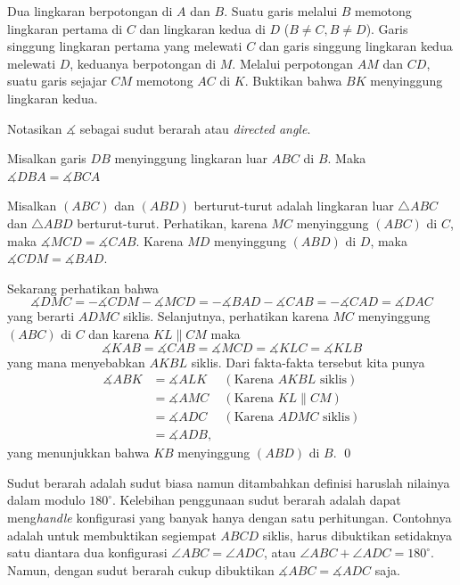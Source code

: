 \documentclass[12pt]{scrartcl}
\begin{document}
	\begin{soaljawab} Dua lingkaran berpotongan di $A$ dan $B$. Suatu garis melalui $B$ memotong lingkaran pertama di $C$ dan lingkaran kedua di $D$ ($B \neq C, B \neq D$).  Garis singgung lingkaran pertama yang melewati $C$ dan garis singgung lingkaran kedua melewati $D$, keduanya berpotongan di $M$. Melalui perpotongan $AM$ dan $CD$, suatu garis sejajar $CM$ memotong $AC$ di $K$. Buktikan bahwa $BK$ menyinggung lingkaran kedua.\\
	
	\begin{solusi}
		Notasikan $\measuredangle$ sebagai sudut berarah atau \textit{directed angle}.
		
		\begin{lemmarev}
		Misalkan garis $DB$ menyinggung lingkaran luar $ABC$ di $B$. Maka $\measuredangle DBA = \measuredangle BCA$
		\end{lemmarev}
		Misalkan $(ABC)$ dan $(ABD)$ berturut-turut adalah lingkaran luar $\triangle ABC$ dan $\triangle ABD$ berturut-turut. Perhatikan, karena $MC$ menyinggung $(ABC)$ di $C$, maka $\measuredangle MCD = \measuredangle CAB$. Karena $MD$ menyinggung $(ABD)$ di $D$, maka $\measuredangle CDM = \measuredangle BAD$.
		
		Sekarang perhatikan bahwa $$\measuredangle DMC = -\measuredangle CDM -\measuredangle MCD = -\measuredangle BAD -\measuredangle CAB = -\measuredangle CAD = \measuredangle DAC$$ yang berarti $ADMC$ siklis. Selanjutnya, perhatikan karena $MC$ menyinggung $(ABC)$ di $C$ dan karena $KL \parallel CM$ maka $$\measuredangle KAB = \measuredangle CAB = \measuredangle MCD = \measuredangle KLC = \measuredangle KLB$$ yang mana menyebabkan $AKBL$ siklis.
		Dari fakta-fakta tersebut kita punya 
		\begin{align*}
		\measuredangle ABK &= \measuredangle ALK & (\text{Karena }AKBL \text{ siklis})\\
		&= \measuredangle AMC & (\text{Karena }KL \parallel CM)\\
		&= \measuredangle ADC & (\text{Karena }ADMC \text{ siklis})\\
		&= \measuredangle ADB,
		\end{align*}yang menunjukkan bahwa $KB$ menyinggung $(ABD)$ di $B$. \qed
	\end{solusi}
	\begin{remark*}
				Sudut berarah adalah sudut biasa namun ditambahkan definisi haruslah nilainya dalam modulo $180^\circ$. Kelebihan penggunaan sudut berarah adalah dapat meng\textit{handle} konfigurasi yang banyak hanya dengan satu perhitungan. Contohnya adalah untuk membuktikan segiempat $ABCD$ siklis, harus dibuktikan setidaknya satu diantara dua konfigurasi $\angle ABC = \angle ADC$, atau $\angle ABC + \angle ADC = 180^\circ$. Namun, dengan sudut berarah cukup dibuktikan $\measuredangle ABC = \measuredangle ADC$ saja.
			\end{remark*}
	\end{soaljawab}
	
\end{document}
